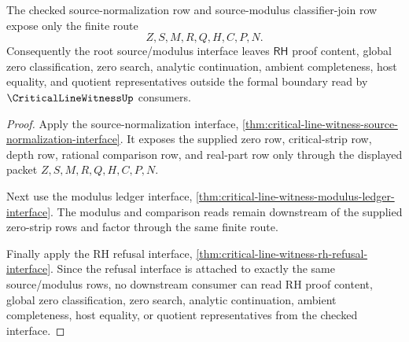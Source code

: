 \begin{theorem}
\label{thm:critical-line-witness-root-source-modulus-interface-formal-boundary}
The checked source-normalization row and source-modulus classifier-join row expose only the finite route
$$
Z,S,M,R,Q,H,C,P,N.
$$
Consequently the root source/modulus interface leaves $\mathsf{RH}$ proof content, global zero classification, zero search, analytic continuation, ambient completeness, host equality, and quotient representatives outside the formal boundary read by $\CriticalLineWitnessUp$ consumers.
\end{theorem}
\begin{proof}
Apply the source-normalization interface, \autoref{thm:critical-line-witness-source-normalization-interface}. It exposes the supplied zero row, critical-strip row, depth row, rational comparison row, and real-part row only through the displayed packet $Z,S,M,R,Q,H,C,P,N$.

Next use the modulus ledger interface, \autoref{thm:critical-line-witness-modulus-ledger-interface}. The modulus and comparison reads remain downstream of the supplied zero-strip rows and factor through the same finite route.

Finally apply the RH refusal interface, \autoref{thm:critical-line-witness-rh-refusal-interface}. Since the refusal interface is attached to exactly the same source/modulus rows, no downstream consumer can read RH proof content, global zero classification, zero search, analytic continuation, ambient completeness, host equality, or quotient representatives from the checked interface.
\end{proof}


